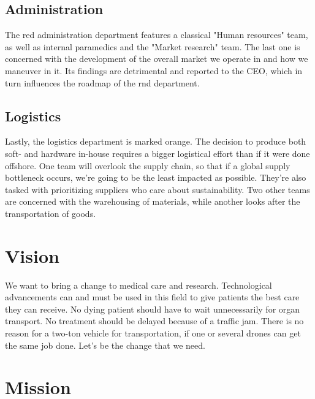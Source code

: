 \subsection{Administration}
The red administration department features a classical "Human resources" team, as well as internal paramedics and the "Market research" team. The last one is concerned with the development of the overall market we operate in and how we maneuver in it. Its findings are detrimental and reported to the CEO, which in turn influences the roadmap of the \ac{rnd} department.
\subsection{Logistics}\label{org-logistics}
Lastly, the logistics department is marked orange. The decision to produce both soft- and hardware in-house requires a bigger logistical effort than if it were done offshore. One team will overlook the supply chain, so that if a global supply bottleneck occurs, we're going to be the least impacted as possible. They're also tasked with prioritizing suppliers who care about sustainability. Two other teams are concerned with the warehousing of materials, while another looks after the transportation of goods.
\section{Vision}
\begin{quote}
\end{quote}

We want to bring a change to medical care and research. Technological advancements can and must be used in this field to give patients the best care they can receive. No dying patient should have to wait unnecessarily for organ transport. No treatment should be delayed because of a traffic jam. There is no reason for a two-ton vehicle for transportation, if one or several drones can get the same job done.
\newline
\newline
Let's be the change that we need.

\section{Mission}
\begin{quote}
\end{quote}

